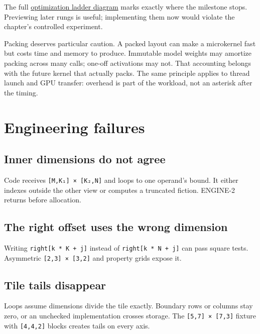 The full
\href{https://github.com/hermonai/inside-the-llm-engine/blob/astra-visual-rewrite/diagrams/linear/optimization-ladder.txt}{optimization
ladder diagram} marks exactly where the milestone stops. Previewing
later rungs is useful; implementing them now would violate the chapter's
controlled experiment.

Packing deserves particular caution. A packed layout can make a
microkernel fast but costs time and memory to produce. Immutable model
weights may amortize packing across many calls; one-off activations may
not. That accounting belongs with the future kernel that actually packs.
The same principle applies to thread launch and GPU transfer: overhead
is part of the workload, not an asterisk after the timing.

\section{Engineering failures}\label{engineering-failures}

\subsection{Inner dimensions do not
agree}\label{inner-dimensions-do-not-agree}

Code receives \texttt{{[}M,K₁{]}\ ×\ {[}K₂,N{]}} and loops to one
operand's bound. It either indexes outside the other view or computes a
truncated fiction. ENGINE-2 returns
\texttt{} before allocation.

\subsection{The right offset uses the wrong
dimension}\label{the-right-offset-uses-the-wrong-dimension}

Writing \texttt{right{[}k\ *\ K\ +\ j{]}} instead of
\texttt{right{[}k\ *\ N\ +\ j{]}} can pass square tests. Asymmetric
\texttt{{[}2,3{]}\ ×\ {[}3,2{]}} and property grids expose it.

\subsection{Tile tails disappear}\label{tile-tails-disappear}

Loops assume dimensions divide the tile exactly. Boundary rows or
columns stay zero, or an unchecked implementation crosses storage. The
\texttt{{[}5,7{]}\ ×\ {[}7,3{]}} fixture with \texttt{{[}4,4,2{]}}
blocks creates tails on every axis.

